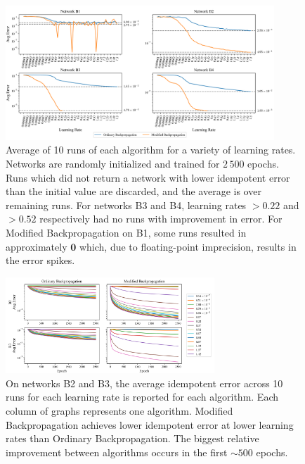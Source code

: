 \documentclass{article}
\theoremstyle{plain}
\theoremstyle{definition}
\theoremstyle{remark}
\begin{document}

\begin{figure}[htbp]
    \centering
    \includegraphics[width=0.9\textwidth]{./resources/abs_err_b1234.png}
    \caption{Average of 10 runs of each algorithm for a variety of learning rates. Networks are randomly initialized and trained for $2\,500$ epochs. Runs which did not return a network with lower idempotent error than the initial value are discarded, and the average is over remaining runs. For networks B3 and B4, learning rates $>0.22$ and $>0.52$ respectively had no runs with improvement in error. For Modified Backpropagation on B1, some runs resulted in approximately $\bm{0}$ which, due to floating-point imprecision, results in the error spikes.}
    \label{fig:avg-abs-err}
\end{figure}
%
\begin{figure}[htbp]
    \centering
    \includegraphics[width=0.7\textwidth]{./resources/runs_err_b23.png}
    \caption{On networks B2 and B3, the average idempotent error across 10 runs for each learning rate is reported for each algorithm. Each column of graphs represents one algorithm. Modified Backpropagation achieves lower idempotent error at lower learning rates than Ordinary Backpropagation. The biggest relative improvement between algorithms occurs in the first $\sim500$ epochs.}
    \label{fig:avg-epoch-err}
\end{figure}
\end{document}
